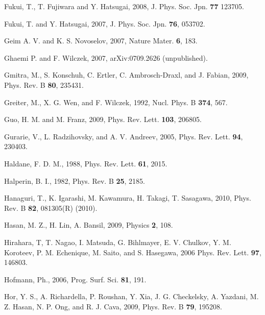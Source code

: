 \documentclass[twocolumn,floatfix,showpacs,rmp,aps]{revtex4}
\begin{document}
\begin{thebibliography}{99}
		Fukui, T., T. Fujiwara and Y. Hatsugai, 2008,
		J. Phys. Soc. Jpn. {\bf 77} 123705.
		
		Fukui, T. and Y. Hatsugai, 2007,
		J. Phys. Soc. Jpn. {\bf 76}, 053702.
		
		Geim A. V. and K. S. Novoselov, 2007,
		Nature Mater. {\bf 6}, 183.
		
		Ghaemi P. and F. Wilczek, 2007,
		arXiv:0709.2626 (unpublished).
		
		Gmitra, M., S. Konschuh, C. Ertler, C. Ambrosch-Draxl, and J. Fabian, 2009,
		Phys. Rev. B {\bf 80}, 235431.
		
		Greiter, M., X. G. Wen, and F. Wilczek, 1992,
		Nucl. Phys. B {\bf 374}, 567.
		
		Guo, H. M. and M. Franz, 2009,
		Phys. Rev. Lett. {\bf 103}, 206805.
		
		Gurarie, V., L. Radzihovsky, and A. V. Andreev, 2005,
		Phys. Rev. Lett. {\bf 94}, 230403.
		
		Haldane, F. D. M., 1988,
		Phys. Rev. Lett. {\bf 61}, 2015.
		
		Halperin, B. I., 1982,
		Phys. Rev. B {\bf 25}, 2185.
		
		Hanaguri, T., K. Igarashi, M. Kawamura, H. Takagi, T. Sasagawa, 2010,
		Phys. Rev. B {\bf 82}, 081305(R) (2010).
		
		Hasan, M. Z., H. Lin, A. Bansil, 2009,
		Physics {\bf 2}, 108.
		
		Hirahara, T, T. Nagao, I. Matsuda, G. Bihlmayer, E. V. Chulkov,
		Y. M. Koroteev, P. M. Echenique, M. Saito, and S. Hasegawa, 2006
		Phys. Rev. Lett. {\bf 97}, 146803.
		
		Hofmann, Ph., 2006,
		Prog. Surf. Sci. {\bf 81}, 191.
		
		Hor, Y. S., A. Richardella, P. Roushan, Y. Xia, J. G. Checkelsky, A. Yazdani,
		M. Z. Hasan, N. P. Ong, and R. J. Cava, 2009,
		Phys. Rev. B {\bf 79}, 195208.
		

\end{thebibliography}
\end{document}
